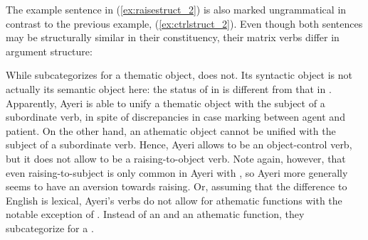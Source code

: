 The example sentence in (\ref{ex:raisestruct_2}) is also marked ungrammatical
in contrast to the previous example, (\ref{ex:ctrlstruct_2}). Even though both
sentences may be structurally similar in their constituency, their matrix verbs
differ in argument structure:

\pex\label{ex:ctrlraisecomp}
\a\label{ex:ctrlraisecomp_octrl}%

\a\label{ex:ctrlraisecomp_raiseo}%
\xe

While  subcategorizes for a thematic object,  does not.
Its syntactic object is not actually its semantic object here: the status of
 in  is different from that in
. Apparently, Ayeri is able to unify a
thematic object with the subject of a subordinate verb, in spite of
discrepancies in case marking between agent and patient. On the other hand, an
athematic object cannot be unified with the subject of a subordinate verb.
Hence, Ayeri allows  to be an object-control verb, but
it does not allow  to be a raising-to-object
verb. Note again, however, that even raising-to-subject is only common in Ayeri
with , so Ayeri more generally seems to have an
aversion towards raising. Or, assuming that the difference to English is
lexical, Ayeri's verbs do not allow for athematic functions with the notable
exception of . Instead of an \XCompl{} and an athematic
function, they subcategorize for a \Compl{}.

